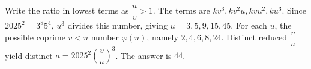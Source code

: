 Write the ratio in lowest terms as $\dfrac{u}{v} > 1$. The terms are $kv^3,kv^2u,kvu^2,ku^3$. Since $2025^2=3^8 5^4$, $u^3$ divides this number, giving $u=3,5,9,15,45$. For each $u$, the possible coprime $v<u$ number $\varphi(u)$, namely $2,4,6,8,24$. Distinct reduced $\dfrac{v}{u}$ yield distinct $a = 2025^2 (\dfrac{v}{u})^3$. The answer is $\boxed{44}$.

